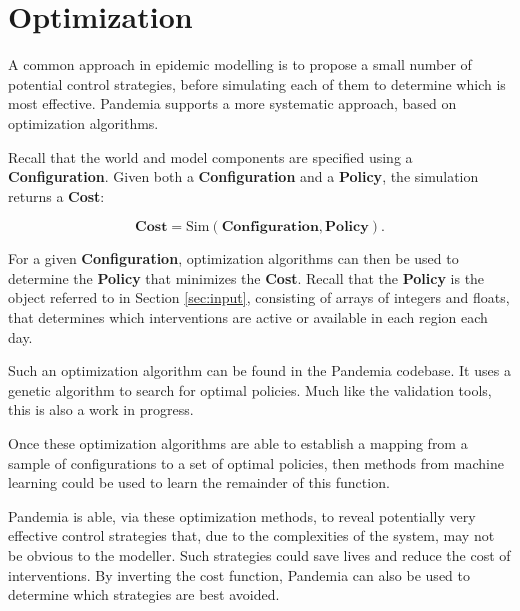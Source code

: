 \documentclass[10pt,letterpaper]{article}
\begin{document}
\section{Optimization}

A common approach in epidemic modelling is to propose a small number of potential control strategies, before simulating each of them to determine which is most effective. Pandemia supports a more systematic approach, based on optimization algorithms.

Recall that the world and model components are specified using a \textbf{Configuration}. Given both a \textbf{Configuration} and a \textbf{Policy}, the simulation returns a \textbf{Cost}:

$$\textbf{Cost} = \text{Sim}(\textbf{Configuration}, \textbf{Policy}).$$

For a given \textbf{Configuration}, optimization algorithms can then be used to determine the \textbf{Policy} that minimizes the \textbf{Cost}. Recall that the \textbf{Policy} is the object referred to in Section \ref{sec:input}, consisting of arrays of integers and floats, that determines which interventions are active or available in each region each day.

Such an optimization algorithm can be found in the Pandemia codebase. It uses a genetic algorithm to search for optimal policies. Much like the validation tools, this is also a work in progress.

Once these optimization algorithms are able to establish a mapping from a sample of configurations to a set of optimal policies, then methods from machine learning could be used to learn the remainder of this function.

Pandemia is able, via these optimization methods, to reveal potentially very effective control strategies that, due to the complexities of the system, may not be obvious to the modeller. Such strategies could save lives and reduce the cost of interventions. By inverting the cost function, Pandemia can also be used to determine which strategies are best avoided.

% 
\end{document}
